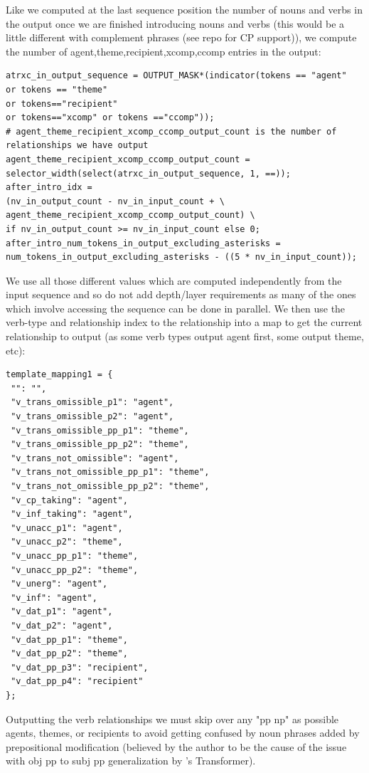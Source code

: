 \documentclass[11pt]{article}
\begin{document}
Like we computed at the last sequence position the number of nouns and verbs in the output once we are finished introducing nouns and verbs (this would be a little different with complement phrases (see repo for CP support)), we compute the number of agent,theme,recipient,xcomp,ccomp entries in the output:
\begin{tiny}
\begin{verbatim}
atrxc_in_output_sequence = OUTPUT_MASK*(indicator(tokens == "agent" 
or tokens == "theme" 
or tokens=="recipient" 
or tokens=="xcomp" or tokens =="ccomp"));
# agent_theme_recipient_xcomp_ccomp_output_count is the number of relationships we have output
agent_theme_recipient_xcomp_ccomp_output_count = 
selector_width(select(atrxc_in_output_sequence, 1, ==));
after_intro_idx = 
(nv_in_output_count - nv_in_input_count + \
agent_theme_recipient_xcomp_ccomp_output_count) \
if nv_in_output_count >= nv_in_input_count else 0;
after_intro_num_tokens_in_output_excluding_asterisks = 
num_tokens_in_output_excluding_asterisks - ((5 * nv_in_input_count));
\end{verbatim}
\end{tiny}
\clearpage
We use all those different values which are computed independently from the input sequence and so do not add depth/layer requirements as many of the ones which involve accessing the sequence can be done in parallel. 
We then use the verb-type and relationship index to the relationship into a map to get the current relationship to output (as some verb types output agent first, some output theme, etc):
\begin{tiny}
\begin{verbatim}
template_mapping1 = {
 "": "",
 "v_trans_omissible_p1": "agent",
 "v_trans_omissible_p2": "agent",
 "v_trans_omissible_pp_p1": "theme",
 "v_trans_omissible_pp_p2": "theme",
 "v_trans_not_omissible": "agent",
 "v_trans_not_omissible_pp_p1": "theme",
 "v_trans_not_omissible_pp_p2": "theme",
 "v_cp_taking": "agent",
 "v_inf_taking": "agent",
 "v_unacc_p1": "agent",
 "v_unacc_p2": "theme",
 "v_unacc_pp_p1": "theme",
 "v_unacc_pp_p2": "theme",
 "v_unerg": "agent",
 "v_inf": "agent",
 "v_dat_p1": "agent",
 "v_dat_p2": "agent",
 "v_dat_pp_p1": "theme",
 "v_dat_pp_p2": "theme",
 "v_dat_pp_p3": "recipient",
 "v_dat_pp_p4": "recipient"
};
\end{verbatim}
\end{tiny}

Outputting the verb relationships we must skip over any "pp np" as possible agents, themes, or recipients to avoid getting confused by noun phrases added by prepositional modification (believed by the author to be the cause of the issue with obj pp to subj pp generalization by \cite{Wu2023}'s Transformer).
\end{document}

